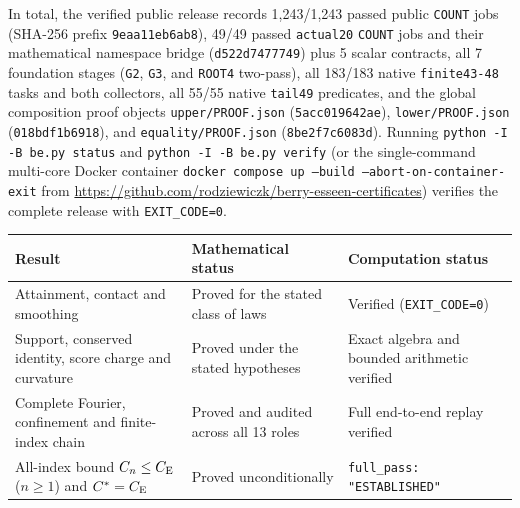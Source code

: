 In total, the verified public release records 1,243/1,243 passed public
\texttt{COUNT} jobs (SHA-256 prefix \texttt{9eaa11eb6ab8}), 49/49 passed
\texttt{actual20} \texttt{COUNT} jobs and their mathematical namespace bridge
(\texttt{d522d7477749}) plus 5 scalar contracts, all 7 foundation stages
(\texttt{G2}, \texttt{G3}, and \texttt{ROOT4} two-pass), all 183/183 native
\texttt{finite43-48} tasks and both collectors, all 55/55 native
\texttt{tail49} predicates, and the global composition proof objects
\texttt{upper/PROOF.json} (\texttt{5acc019642ae}), \texttt{lower/PROOF.json}
(\texttt{018bdf1b6918}), and \texttt{equality/PROOF.json}
(\texttt{8be2f7c6083d}). Running \texttt{python -I -B be.py status} and
\texttt{python -I -B be.py verify} (or the single-command multi-core Docker
container \texttt{docker compose up --build --abort-on-container-exit} from
\url{https://github.com/rodziewiczk/berry-esseen-certificates}) verifies the
complete release with \texttt{EXIT\_CODE=0}.

\begin{center}
\begin{tabular}{@{}P{0.36\textwidth}P{0.30\textwidth}P{0.27\textwidth}@{}}
\toprule
Result & Mathematical status & Computation status\\
\midrule
Attainment, contact and smoothing & Proved for the stated class of laws &
Verified (\texttt{EXIT\_CODE=0})\\[3pt]
Support, conserved identity, score charge and curvature & Proved under the
stated hypotheses & Exact algebra and bounded arithmetic verified\\[3pt]
Complete Fourier, confinement and finite-index chain & Proved and audited across
all 13 roles & Full end-to-end replay verified\\[3pt]
All-index bound $C_n\le C_{\mathrm E}$ ($n\ge1$) and $C^*=C_{\mathrm E}$ & Proved unconditionally &
\texttt{full\_pass: "ESTABLISHED"}\\
\bottomrule
\end{tabular}
\end{center}
